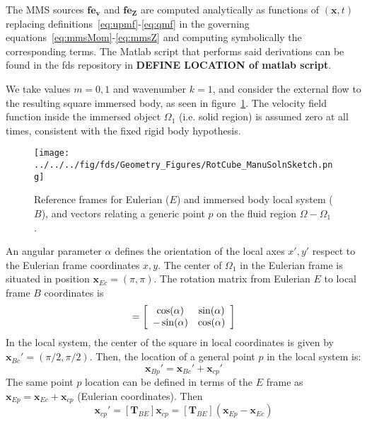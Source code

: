 \documentclass[12pt]{article}
\begin{document}
 The MMS sources $\mathbf{fe_v}$ and $\mathbf{fe_Z}$ are computed analytically as functions of $(\mathbf{x},t)$ replacing definitions~\eqref{eq:upmf}-\eqref{eq:qmf} in the governing equations~\eqref{eq:mmsMom}-\eqref{eq:mmsZ} and computing symbolically the corresponding terms. The Matlab script that performs said derivations can be found in the fds repository in \textbf{DEFINE LOCATION of matlab script}.



We take values $m=0,1$ and wavenumber $k=1$, and consider the external flow to the resulting square immersed body, as seen in figure~\ref{Fig:ManuSoln}. The velocity field function inside the immersed object $\Omega_1$ (i.e. solid region) is assumed zero at all times, consistent with the fixed rigid body hypothesis.
%
\begin{figure}[h]
      \centering
      \texttt{[image: ../../../fig/fds/Geometry\_Figures/RotCube\_ManuSolnSketch.png]}
      \caption{Reference frames for Eulerian ($E$) and immersed body local system ($B$), and vectors relating a generic point $p$ on the fluid region $\Omega-\Omega_1$.}
	\label{Fig:ManuSoln}
\end{figure}
%
An angular parameter $\alpha$ defines the orientation of the local axes $x',y'$ respect to the Eulerian frame coordinates $x,y$. The center of $\Omega_1$ in the Eulerian frame is situated in position $\mathbf{x}_{Ec}=(\pi,\pi)$. The rotation matrix from Eulerian $E$ to local frame $B$ coordinates is
%
\begin{equation}
  [\mathbf{T}_{BE}] = \left[ \begin{array}{c c}
                                          \cos(\alpha) & \sin(\alpha) \\
                                         -\sin(\alpha)  & \cos(\alpha) \end{array} \right]
\end{equation}
%
In the local system, the center of the square in local coordinates is given by $\mathbf{x}_{Bc}'=(\pi/2,\pi/2)$. Then, the location of a general point $p$ in the local system is:
%
\begin{equation}
    \mathbf{x}_{Bp}'= \mathbf{x}_{Bc}' +\mathbf{x}_{cp}'
\end{equation}
%
The same point $p$ location can be defined in terms of the $E$ frame as $\mathbf{x}_{Ep}= \mathbf{x}_{Ec} +\mathbf{x}_{cp}$ (Eulerian coordinates). Then
%
\begin{equation}
    \mathbf{x}_{cp}'=[\mathbf{T}_{BE}] \mathbf{x}_{cp}=[\mathbf{T}_{BE}] \left( \mathbf{x}_{Ep} - \mathbf{x}_{Ec} \right)
\end{equation}
\end{document}
